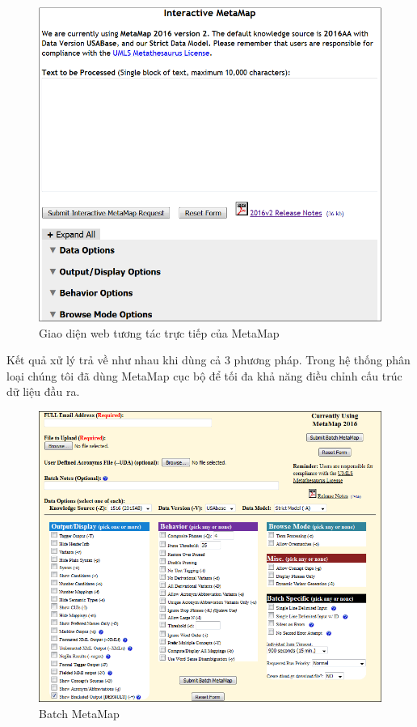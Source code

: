 \begin{figure}[h]
\centering
\includegraphics[scale=0.7]{../hinh/mmweb.png}
\caption{Giao diện web tương tác trực tiếp của MetaMap}
\label{fig:mmweb}
\end{figure}

Kết quả xử lý trả về như nhau khi dùng cả 3 phương pháp. Trong hệ thống phân loại chúng tôi đã dùng MetaMap cục bộ để tối đa khả năng điều chỉnh cấu trúc dữ liệu đầu ra. \\

\begin{figure}[h]
\centering
\includegraphics[scale=0.7]{../hinh/batchmm.png}
\caption{Batch MetaMap}
\label{fig:batchmm}
\end{figure}

